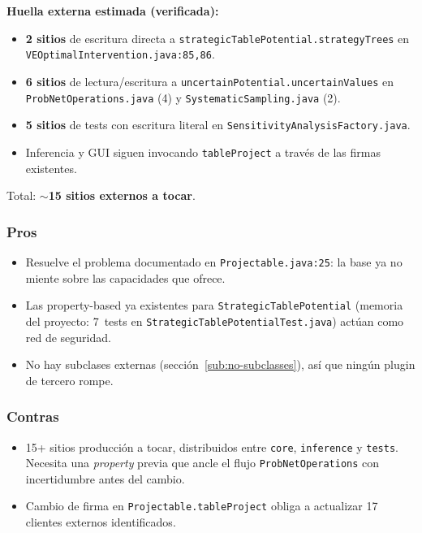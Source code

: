 \documentclass[11pt,a4paper]{article}
\newcommand{\code}[1]{\texttt{#1}}
\newcommand{\bad}[1]{\textcolor{codered}{\textbf{#1}}}
\begin{document}
\textbf{Huella externa estimada (verificada):}

\begin{itemize}[leftmargin=*]
  \item \bad{2 sitios} de escritura directa a
        \code{strategicTablePotential.strategyTrees} en
        \code{VEOptimalIntervention.java:85,86}.
  \item \bad{6 sitios} de lectura/escritura a
        \code{uncertainPotential.uncertainValues} en
        \code{ProbNetOperations.java} (4) y
        \code{SystematicSampling.java} (2).
  \item \bad{5 sitios} de tests con escritura literal en
        \code{SensitivityAnalysisFactory.java}.
  \item Inferencia y GUI siguen invocando \code{tableProject} a través de las
        firmas existentes.
\end{itemize}

Total: \textbf{$\sim$15 sitios externos a tocar}.

\subsubsection*{Pros}
\begin{itemize}[leftmargin=*]
  \item Resuelve el problema documentado en
        \code{Projectable.java:25}: la base ya no miente sobre las capacidades
        que ofrece.
  \item Las property-based ya existentes para
        \code{StrategicTablePotential} (memoria del proyecto: 7~tests en
        \code{StrategicTablePotentialTest.java}) actúan como red de seguridad.
  \item No hay subclases externas (sección~\ref{sub:no-subclasses}), así que
        ningún plugin de tercero rompe.
\end{itemize}

\subsubsection*{Contras}
\begin{itemize}[leftmargin=*]
  \item 15+ sitios producción a tocar, distribuidos entre \code{core},
        \code{inference} y \code{tests}. Necesita una \emph{property} previa
        que ancle el flujo \code{ProbNet\-Operations} con incertidumbre antes
        del cambio.
  \item Cambio de firma en \code{Projectable.tableProject} obliga a actualizar
        17 clientes externos identificados.
\end{itemize}
\end{document}
